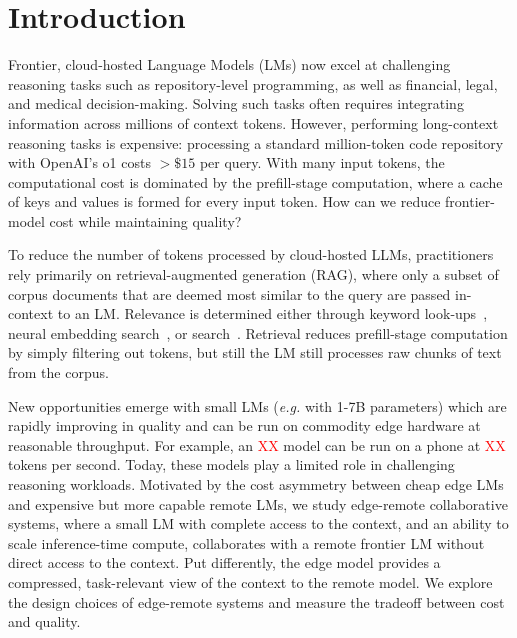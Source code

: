 \section{Introduction}
\label{sec:intro}
Frontier, cloud-hosted Language Models (LMs) now excel at challenging reasoning tasks such as repository-level programming, as well as financial, legal, and medical decision-making. Solving such tasks often requires integrating information across millions of context tokens. However, performing long-context reasoning tasks is expensive: processing a standard million-token code repository with OpenAI’s o1 costs $>\$15$ per query. With many input tokens, the computational cost is dominated by the prefill-stage computation, where a cache of keys and values is formed for every input token. How can we reduce frontier-model cost while maintaining quality?

To reduce the number of tokens processed by cloud-hosted LLMs, practitioners rely primarily on retrieval-augmented generation (RAG), where only a subset of corpus documents that are deemed most similar to the query are passed in-context to an LM. Relevance is determined either through keyword look-ups~\cite{robertson_relevance_2009}, neural embedding search~\cite{karpukhin2020dense,lewis2020retrieval,lee2019latent}, or search~\cite{nakano2021webgpt}. Retrieval reduces prefill-stage computation by simply filtering out tokens, but still the LM still processes raw chunks of text from the corpus. 

New opportunities emerge with small LMs (\textit{e.g.} with 1-7B parameters) which are rapidly improving in quality and can be run on commodity edge hardware at reasonable throughput. For example, an \textcolor{red}{XX} model can be run on a phone at \textcolor{red}{XX} tokens per second. Today, these models play a limited role in challenging reasoning workloads. Motivated by the cost asymmetry between cheap edge LMs and expensive but more capable remote LMs, we study edge-remote collaborative systems, where a small LM with complete access to the context, and an ability to scale inference-time compute, collaborates with a remote frontier LM without direct access to the context. Put differently, the edge model provides a compressed, task-relevant view of the context to the remote model. 
We explore the design choices of edge-remote systems and measure the tradeoff between cost and quality.

